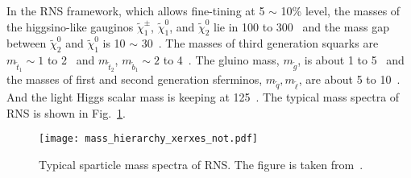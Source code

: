 %
In the RNS framework, which allows fine-tining at 5 $\sim$ 10\% level, the masses of the higgsino-like gauginos $\widetilde{\chi}^{\pm}_{1}$, $\widetilde{\chi}^{0}_{1}$, and $\widetilde{\chi}^{0}_{2}$ lie in 100 to 300~{\GeV} and the mass gap between $\widetilde{\chi}^{0}_{2}$ and $\widetilde{\chi}^{0}_{1}$ is 10 $\sim$ 30~{\GeV}.
The masses of third generation squarks are $m_{\widetilde{t}_{1}} \sim 1$ to 2~{\TeV} and $m_{\widetilde{t}_{2}}$, $m_{\widetilde{b}_{1}} \sim 2$ to 4~{\TeV}.
The gluino mass, $m_{\widetilde{g}}$, is about 1 to 5~{\TeV} and the masses of first and second generation sferminos, $m_{\widetilde{q}}, m_{\widetilde{\ell}}$, are about 5 to 10~{\TeV}.
And the light Higgs scalar mass is keeping at 125~{\GeV}.
The typical mass spectra of RNS is shown in Fig.~\ref{fig:susy_RNS_mass_spectra}.

\begin{figure}[htb]
    \begin{center}
        \texttt{[image: mass\_hierarchy\_xerxes\_not.pdf]}
        \caption{Typical sparticle mass spectra of RNS.
        The figure is taken from~\cite{Baer:2013gva}.}
        \label{fig:susy_RNS_mass_spectra}
    \end{center}
\end{figure}





